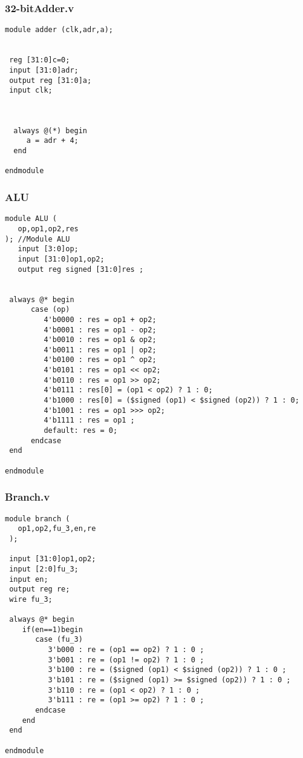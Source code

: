 \documentclass[12pt]{article}
\begin{document}
\subsubsection{32-bitAdder.v}
\begin{lstlisting}
module adder (clk,adr,a);


 reg [31:0]c=0;
 input [31:0]adr;
 output reg [31:0]a;
 input clk;

  
  
  always @(*) begin
     a = adr + 4;
  end
    
endmodule
\end{lstlisting}

\subsubsection{ALU}
\begin{lstlisting}
module ALU (
   op,op1,op2,res
); //Module ALU
   input [3:0]op;
   input [31:0]op1,op2;
   output reg signed [31:0]res ;


 always @* begin
      case (op)
         4'b0000 : res = op1 + op2; 
         4'b0001 : res = op1 - op2;
         4'b0010 : res = op1 & op2;
         4'b0011 : res = op1 | op2;
         4'b0100 : res = op1 ^ op2;
         4'b0101 : res = op1 << op2;
         4'b0110 : res = op1 >> op2;
         4'b0111 : res[0] = (op1 < op2) ? 1 : 0;
         4'b1000 : res[0] = ($signed (op1) < $signed (op2)) ? 1 : 0;
         4'b1001 : res = op1 >>> op2;
         4'b1111 : res = op1 ;
         default: res = 0;
      endcase
 end

endmodule
\end{lstlisting}


\subsubsection{Branch.v}
\begin{lstlisting}
module branch (
   op1,op2,fu_3,en,re
 );

 input [31:0]op1,op2;
 input [2:0]fu_3;
 input en;
 output reg re;
 wire fu_3;

 always @* begin
    if(en==1)begin
       case (fu_3)
          3'b000 : re = (op1 == op2) ? 1 : 0 ;
          3'b001 : re = (op1 != op2) ? 1 : 0 ;
          3'b100 : re = ($signed (op1) < $signed (op2)) ? 1 : 0 ;
          3'b101 : re = ($signed (op1) >= $signed (op2)) ? 1 : 0 ;
          3'b110 : re = (op1 < op2) ? 1 : 0 ;
          3'b111 : re = (op1 >= op2) ? 1 : 0 ;
       endcase
    end
 end
   
endmodule
\end{lstlisting}
\end{document}
